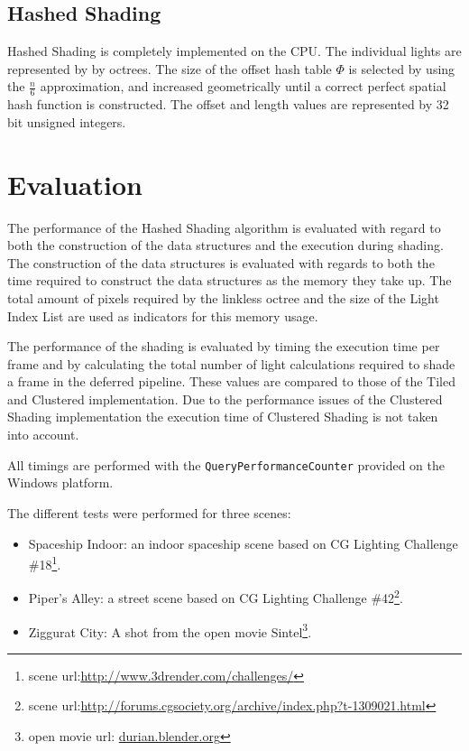 \subsection{Hashed Shading}

Hashed Shading is completely implemented on the CPU.  The individual lights are
represented by by octrees. The size of the offset hash table $\Phi$ is selected
by using the $\frac{n}{6}$ approximation, and increased geometrically until a correct
perfect spatial hash function is constructed. The offset and length values are
represented by 32 bit unsigned integers.

\section{Evaluation}

The performance of the Hashed Shading algorithm is evaluated with regard to both
the construction of the data structures and the execution during shading. The construction of
the data structures is evaluated with regards to both the time required to construct the
data structures as the memory they take up. The total amount of pixels required by the linkless
octree and the size of the Light Index List are used as indicators for this memory usage.

The performance of the shading is evaluated by timing the execution time per frame and by
calculating the total number of light calculations required to shade a frame in the
deferred pipeline. These values are compared to those of the Tiled and Clustered implementation.
Due to the performance issues of the Clustered Shading implementation the execution time of
Clustered Shading is not taken into account.

All timings are performed with the \texttt{QueryPerformanceCounter} provided on the Windows
platform.

The different tests were performed for three scenes:

\begin{itemize}
  \item Spaceship Indoor: an indoor spaceship scene based on CG Lighting Challenge \#18\footnote{scene url:\url{http://www.3drender.com/challenges/}}.
  \item Piper's Alley: a street scene based on CG Lighting Challenge \#42\footnote{scene url:\url{http://forums.cgsociety.org/archive/index.php?t-1309021.html}}.
  \item Ziggurat City: A shot from the open movie Sintel\footnote{open movie url: \url{durian.blender.org}}.
\end{itemize}

